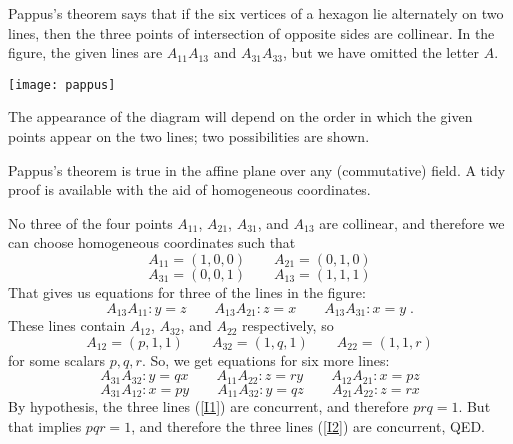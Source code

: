 \documentclass[12pt]{article}
\begin{document}
Pappus's theorem says that if the six vertices of a hexagon lie
alternately on two lines, then
the three points of intersection of opposite sides are collinear.
In the figure, the given lines are $A_{11}A_{13}$ and $A_{31}A_{33}$,
but we have omitted the letter $A$.

\texttt{[image: pappus]}

The appearance of the diagram will depend on the order in which the
given points appear on the two lines; two possibilities are shown.

Pappus's theorem is true in the affine plane over any (commutative) field.
A tidy proof is available with the aid of homogeneous coordinates.

No three of the four points $A_{11}$, $A_{21}$, $A_{31}$, and $A_{13}$ are
collinear, and therefore we can choose homogeneous coordinates such that
$$A_{11}=(1,0,0)\qquad A_{21}=(0,1,0)$$
$$A_{31}=(0,0,1)\qquad A_{13}=(1,1,1)$$
That gives us equations for three of the lines in the figure:
$$A_{13}A_{11}:y=z\qquad A_{13}A_{21}:z=x\qquad A_{13}A_{31}:x=y\;.$$
These lines contain $A_{12}$, $A_{32}$, and $A_{22}$ respectively, so
$$A_{12}=(p,1,1)\qquad A_{32}=(1,q,1)\qquad A_{22}=(1,1,r)$$
for some scalars $p,q,r$. So, we get equations for six more lines:
\begin{equation} \label{I1}
A_{31}A_{32}:y=qx\qquad A_{11}A_{22}:z=ry\qquad A_{12}A_{21}:x=pz
\end{equation}
\begin{equation} \label{I2}
A_{31}A_{12}:x=py\qquad A_{11}A_{32}:y=qz\qquad A_{21}A_{22}:z=rx
\end{equation}
By hypothesis, the three lines (\ref{I1}) are concurrent, and therefore
$prq=1$. But that implies $pqr=1$, and therefore the three lines
(\ref{I2}) are concurrent, QED.
\end{document}
